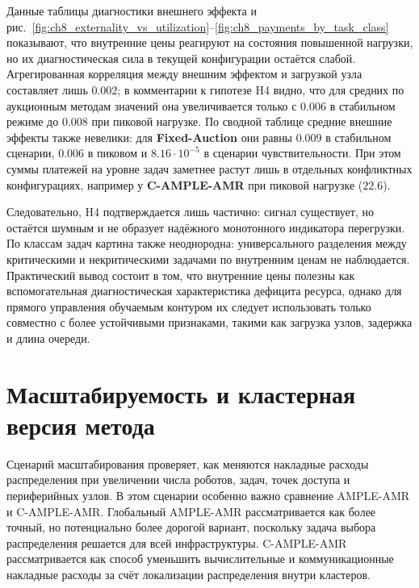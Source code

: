 

Данные таблицы диагностики внешнего эффекта и рис.~\ref{fig:ch8_externality_vs_utilization}--\ref{fig:ch8_payments_by_task_class} показывают, что внутренние цены реагируют на состояния повышенной нагрузки, но их диагностическая сила в текущей конфигурации остаётся слабой. Агрегированная корреляция между внешним эффектом и загрузкой узла составляет лишь $0.002$; в комментарии к гипотезе H4 видно, что для средних по аукционным методам значений она увеличивается только с $0.006$ в стабильном режиме до $0.008$ при пиковой нагрузке. По сводной таблице средние внешние эффекты также невелики: для \textbf{Fixed-Auction} они равны $0.009$ в стабильном сценарии, $0.006$ в пиковом и $8.16\cdot 10^{-5}$ в сценарии чувствительности. При этом суммы платежей на уровне задач заметнее растут лишь в отдельных конфликтных конфигурациях, например у \textbf{C-AMPLE-AMR} при пиковой нагрузке ($22.6$).

Следовательно, H4 подтверждается лишь частично: сигнал существует, но остаётся шумным и не образует надёжного монотонного индикатора перегрузки. По классам задач картина также неоднородна: универсального разделения между критическими и некритическими задачами по внутренним ценам не наблюдается. Практический вывод состоит в том, что внутренние цены полезны как вспомогательная диагностическая характеристика дефицита ресурса, однако для прямого управления обучаемым контуром их следует использовать только совместно с более устойчивыми признаками, такими как загрузка узлов, задержка и длина очереди.

\section{Масштабируемость и кластерная версия метода}

Сценарий масштабирования проверяет, как меняются накладные расходы распределения при увеличении числа роботов, задач, точек доступа и периферийных узлов. В этом сценарии особенно важно сравнение AMPLE-AMR и C-AMPLE-AMR. Глобальный AMPLE-AMR рассматривается как более точный, но потенциально более дорогой вариант, поскольку задача выбора распределения решается для всей инфраструктуры. C-AMPLE-AMR рассматривается как способ уменьшить вычислительные и коммуникационные накладные расходы за счёт локализации распределения внутри кластеров.

